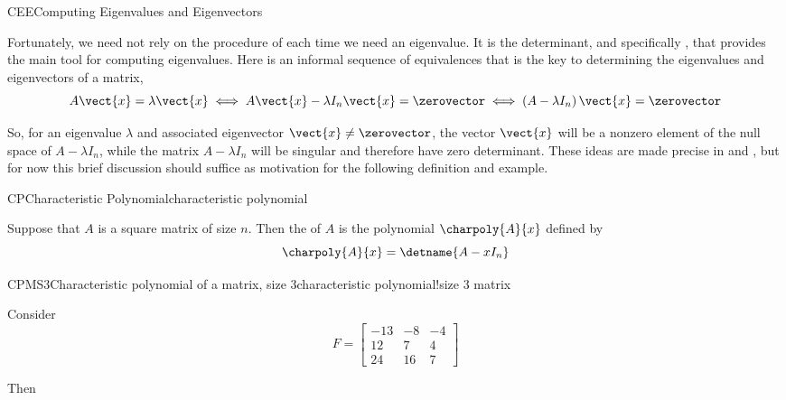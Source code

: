 \begin{subsect}{CEE}{Computing Eigenvalues and Eigenvectors}
%
\begin{para}Fortunately, we need not rely on the procedure of  each time we need an eigenvalue.  It is the determinant, and specifically , that provides the main tool for computing eigenvalues.  Here is an informal sequence of equivalences that is the key to determining the eigenvalues and eigenvectors of a matrix,
%
\begin{equation*}
A\vect{x}=\lambda\vect{x}\iff
A\vect{x}-\lambda I_n\vect{x}=\zerovector\iff
\left(A-\lambda I_n\right)\vect{x}=\zerovector
\end{equation*}
\end{para}
%
\begin{para}So, for an eigenvalue $\lambda$ and associated eigenvector $\vect{x}\neq\zerovector$, the vector $\vect{x}$ will be a nonzero element of the null space of $A-\lambda I_n$, while the matrix $A-\lambda I_n$ will be singular and therefore have zero determinant.  These ideas are made precise in  and , but for now this brief discussion should suffice as motivation for the following definition and example.\end{para}
%
\begin{definition}{CP}{Characteristic Polynomial}{characteristic polynomial}
\begin{para}Suppose that $A$ is a square matrix of size $n$.  Then the  of $A$ is the polynomial $\charpoly{A}{x}$ defined by
%
\begin{equation*}
\charpoly{A}{x}=\detname{A-xI_n}
\end{equation*}
\end{para}
%
\end{definition}
%
%
\begin{example}{CPMS3}{Characteristic polynomial of a matrix, size 3}{characteristic polynomial!size 3 matrix}
\begin{para}Consider
%
\begin{equation*}
F=
\begin{bmatrix}
-13 & -8 & -4\\
12 & 7 & 4\\
24 & 16 & 7
\end{bmatrix}
\end{equation*}
\end{para}
%
\begin{para}Then

\end{para}
\end{example}
\end{subsect}
